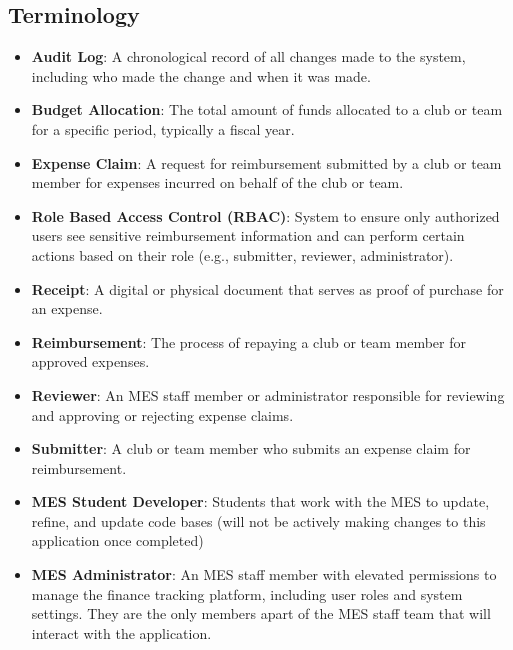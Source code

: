 \documentclass[12pt]{article}
\begin{document}
  \subsection{Terminology}
    \begin{itemize}
      \item \textbf{Audit Log}: A chronological record of all changes made to the system, including who made the change and when it was made.
      \item \textbf{Budget Allocation}: The total amount of funds allocated to a club or team for a specific period, typically a fiscal year.
      \item \textbf{Expense Claim}: A request for reimbursement submitted by a club or team member for expenses incurred on behalf of the club or team.
      \item \textbf{Role Based Access Control (RBAC)}: System to ensure only authorized users see sensitive reimbursement information and can perform certain actions based on their role (e.g., submitter, reviewer, administrator).
      \item \textbf{Receipt}: A digital or physical document that serves as proof of purchase for an expense.
      \item \textbf{Reimbursement}: The process of repaying a club or team member for approved expenses.
      \item \textbf{Reviewer}: An MES staff member or administrator responsible for reviewing and approving or rejecting expense claims.
      \item \textbf{Submitter}: A club or team member who submits an expense claim for reimbursement.
      \item \textbf{MES Student Developer}: Students that work with the MES to update, refine, and update code bases (will not be actively making changes to this application once completed)
      \item \textbf{MES Administrator}: An MES staff member with elevated permissions to manage the finance tracking platform, including user roles and system settings. They are the only members apart of the MES staff team that will interact with the application.
    \end{itemize}
\end{document}
